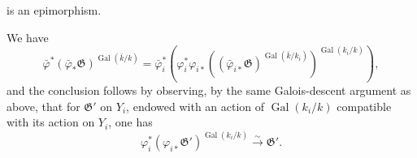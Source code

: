 is an epimorphism.

We have
\begin{equation*}
\bar\varphi^*(\bar\varphi_*\mathfrak G)^{
  \operatorname{Gal}(\bar k/k)}
=
\bar\varphi_i^*\!\left(
  \varphi_i^*\varphi_{i*}
  \left((\bar\varphi_{i*}\mathfrak G)^{
    \operatorname{Gal}(\bar k/k_i)}\right)^{
    \operatorname{Gal}(k_i/k)}
\right),
\end{equation*}
and the conclusion follows by observing, by the same Galois-descent
argument as above, that for $\mathfrak G'$ on $Y_i$, endowed with an
action of $\operatorname{Gal}(k_i/k)$ compatible with its action on
$Y_i$, one has
\begin{equation*}
\varphi_i^*(\varphi_{i*}\mathfrak G')^{
  \operatorname{Gal}(k_i/k)}
\xrightarrow{\sim}\mathfrak G'.
\end{equation*}
